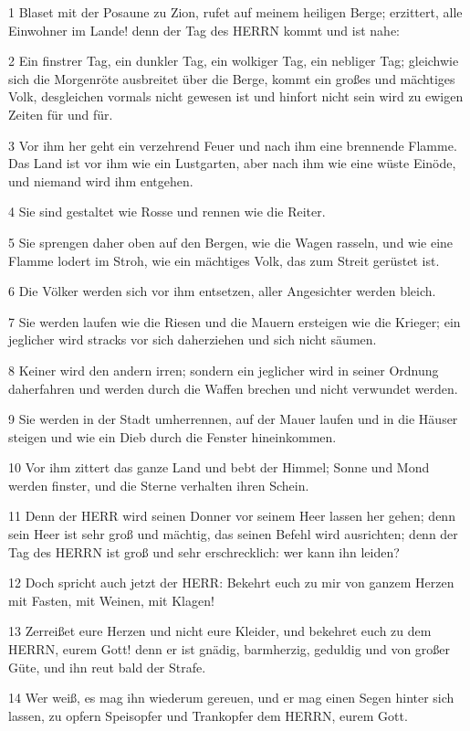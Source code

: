 \par 1 Blaset mit der Posaune zu Zion, rufet auf meinem heiligen Berge; erzittert, alle Einwohner im Lande! denn der Tag des HERRN kommt und ist nahe:
\par 2 Ein finstrer Tag, ein dunkler Tag, ein wolkiger Tag, ein nebliger Tag; gleichwie sich die Morgenröte ausbreitet über die Berge, kommt ein großes und mächtiges Volk, desgleichen vormals nicht gewesen ist und hinfort nicht sein wird zu ewigen Zeiten für und für.
\par 3 Vor ihm her geht ein verzehrend Feuer und nach ihm eine brennende Flamme. Das Land ist vor ihm wie ein Lustgarten, aber nach ihm wie eine wüste Einöde, und niemand wird ihm entgehen.
\par 4 Sie sind gestaltet wie Rosse und rennen wie die Reiter.
\par 5 Sie sprengen daher oben auf den Bergen, wie die Wagen rasseln, und wie eine Flamme lodert im Stroh, wie ein mächtiges Volk, das zum Streit gerüstet ist.
\par 6 Die Völker werden sich vor ihm entsetzen, aller Angesichter werden bleich.
\par 7 Sie werden laufen wie die Riesen und die Mauern ersteigen wie die Krieger; ein jeglicher wird stracks vor sich daherziehen und sich nicht säumen.
\par 8 Keiner wird den andern irren; sondern ein jeglicher wird in seiner Ordnung daherfahren und werden durch die Waffen brechen und nicht verwundet werden.
\par 9 Sie werden in der Stadt umherrennen, auf der Mauer laufen und in die Häuser steigen und wie ein Dieb durch die Fenster hineinkommen.
\par 10 Vor ihm zittert das ganze Land und bebt der Himmel; Sonne und Mond werden finster, und die Sterne verhalten ihren Schein.
\par 11 Denn der HERR wird seinen Donner vor seinem Heer lassen her gehen; denn sein Heer ist sehr groß und mächtig, das seinen Befehl wird ausrichten; denn der Tag des HERRN ist groß und sehr erschrecklich: wer kann ihn leiden?
\par 12 Doch spricht auch jetzt der HERR: Bekehrt euch zu mir von ganzem Herzen mit Fasten, mit Weinen, mit Klagen!
\par 13 Zerreißet eure Herzen und nicht eure Kleider, und bekehret euch zu dem HERRN, eurem Gott! denn er ist gnädig, barmherzig, geduldig und von großer Güte, und ihn reut bald der Strafe.
\par 14 Wer weiß, es mag ihn wiederum gereuen, und er mag einen Segen hinter sich lassen, zu opfern Speisopfer und Trankopfer dem HERRN, eurem Gott.
